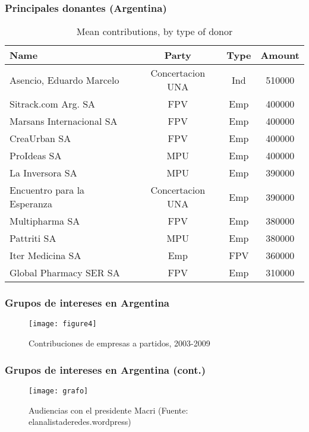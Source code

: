 \documentclass[handout,final,xcolor=dvipsnames]{beamer}
\begin{document}
\begin{frame}\frametitle{Principales donantes (Argentina)}
\vspace{-1cm}
 \begin{table}[htbp]
    \centering
 \caption{Mean contributions, by type of donor}
    \label{tab:1}
    \begin{tabular}[htbp]{|l|c|c|c|} \hline
      Name &  Party & Type & Amount\\ \hline \hline
Asencio, Eduardo Marcelo & Concertacion UNA & Ind & 510000 \\ \hline
Sitrack.com Arg. SA & FPV & Emp & 400000 \\ \hline
Marsans Internacional SA & FPV & Emp & 400000 \\ \hline
CreaUrban SA & FPV & Emp & 400000 \\ \hline
ProIdeas SA & MPU & Emp & 400000 \\ \hline
La Inversora SA & MPU & Emp & 390000 \\ \hline
Encuentro para la Esperanza & Concertacion UNA & Emp & 390000 \\ \hline
Multipharma SA & FPV & Emp & 380000 \\ \hline
Pattriti SA & MPU & Emp & 380000\\ \hline
Iter Medicina SA & Emp & FPV & 360000 \\ \hline
Global Pharmacy SER SA & FPV & Emp & 310000 \\ \hline \hline
    \end{tabular}
  \end{table}

\end{frame}


\begin{frame}\frametitle{Grupos de intereses en Argentina}
\begin{figure}[htbp] \vspace{-0.25cm}
  \centering
  \texttt{[image: figure4]} \vspace{0cm}
  \caption{Contribuciones de empresas a partidos, 2003-2009}
  \label{fig:3}
\end{figure}
\end{frame}




\begin{frame}\frametitle{Grupos de intereses en Argentina (cont.)}
\begin{figure}[htbp] \vspace{0cm}
  \centering
  \texttt{[image: grafo]} \vspace{0cm}
  \caption{Audiencias con el presidente Macri (Fuente: elanalistaderedes.wordpress)}
  \label{fig:3}
\end{figure}
\end{frame}
\end{document}
